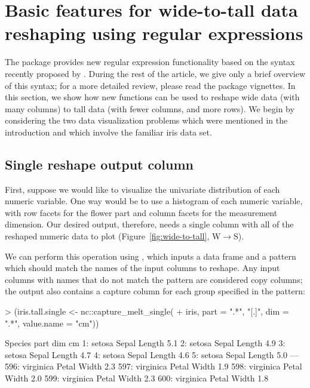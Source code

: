\section{Basic features for wide-to-tall data reshaping using regular expressions}

The  package provides new regular expression functionality
based on the syntax recently proposed by
\citet{HOCKING2019-namedCapture}. During the rest of the article, we
give only a brief overview of this syntax; for a more detailed review,
please read the  package vignettes.
In this section, we show how new  functions can be used to
reshape wide data (with many columns) to tall data (with fewer
columns, and more rows). We begin by considering the two data
visualization problems which were mentioned in the introduction and
which involve the familiar iris data set.

\subsection{Single reshape output column}

First, suppose we would like
to visualize the univariate distribution of each numeric variable. One
way would be to use a histogram of each numeric variable, with row
facets for the flower part and column facets for the measurement
dimension. Our desired output, therefore, needs a single column with all
of the reshaped numeric data to plot (Figure~\ref{fig:wide-to-tall},
W$\rightarrow$S).

We can perform this operation using ,
which inputs a data frame and a pattern which should match the names
of the input columns to reshape. Any input columns with names that do
not match the pattern are considered copy columns; the output also
contains a capture column for each group specified in the pattern:

\begin{Schunk}
\begin{Sinput}
> (iris.tall.single <- nc::capture_melt_single(
+   iris, part = ".*", "[.]", dim = ".*", value.name = "cm"))
\end{Sinput}
\begin{Soutput}
       Species  part    dim  cm
  1:    setosa Sepal Length 5.1
  2:    setosa Sepal Length 4.9
  3:    setosa Sepal Length 4.7
  4:    setosa Sepal Length 4.6
  5:    setosa Sepal Length 5.0
 ---                           
596: virginica Petal  Width 2.3
597: virginica Petal  Width 1.9
598: virginica Petal  Width 2.0
599: virginica Petal  Width 2.3
600: virginica Petal  Width 1.8
\end{Soutput}
\end{Schunk}

